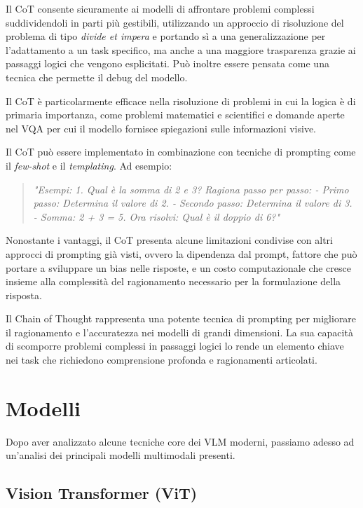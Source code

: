 \documentclass[../main.tex]{subfiles}
\begin{document}
Il CoT consente sicuramente ai modelli di affrontare problemi complessi suddividendoli in parti più gestibili, utilizzando un approccio di risoluzione del problema di tipo \textit{divide et impera} e portando sì a una generalizzazione per l'adattamento a un task specifico, ma anche a una maggiore trasparenza grazie ai passaggi logici che vengono esplicitati.
Può inoltre essere pensata come una tecnica che permette il debug del modello.

Il CoT è particolarmente efficace nella risoluzione di problemi in cui la logica è di primaria importanza, come problemi matematici e scientifici \cite{lu2022learnexplainmultimodalreasoning} e domande aperte nel VQA per cui il modello fornisce spiegazioni sulle informazioni visive.

Il CoT può essere implementato in combinazione con tecniche di prompting come il \textit{few-shot} e il \textit{templating}. Ad esempio:
\begin{quote}
    \textit{"Esempi:  
    1. Qual è la somma di 2 e 3? Ragiona passo per passo:  
    - Primo passo: Determina il valore di 2.  
    - Secondo passo: Determina il valore di 3.  
    - Somma: 2 + 3 = 5.  
    Ora risolvi: Qual è il doppio di 6?"}
\end{quote}

Nonostante i vantaggi, il CoT presenta alcune limitazioni condivise con altri approcci di prompting già visti, ovvero la dipendenza dal prompt, fattore che può portare a sviluppare un bias nelle risposte, e un costo computazionale che cresce insieme alla complessità del ragionamento necessario per la formulazione della risposta.

Il Chain of Thought rappresenta una potente tecnica di prompting per migliorare il ragionamento e l'accuratezza nei modelli di grandi dimensioni. La sua capacità di scomporre problemi complessi in passaggi logici lo rende un elemento chiave nei task che richiedono comprensione profonda e ragionamenti articolati.

\section{Modelli}

Dopo aver analizzato alcune tecniche core dei VLM moderni, passiamo adesso ad un'analisi dei principali modelli multimodali presenti.

\subsection{Vision Transformer (ViT)}
\end{document}
